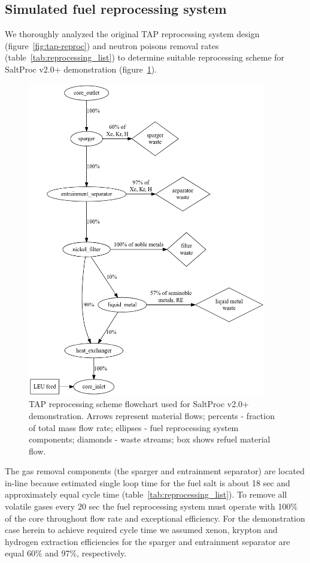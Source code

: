 \documentclass[12pt]{article} %
\begin{document}
\subsection{Simulated fuel reprocessing system}
We thoroughly analyzed the original \gls{TAP} reprocessing system design 
(figure~\ref{fig:tap-reproc}) and neutron poisons removal rates 
(table~\ref{tab:reprocessing_list}) to determine suitable reprocessing 
scheme for SaltProc v2.0+ demonstration (figure~\ref{fig:demo-repro-scheme}).
\begin{figure}[htp!] %
  \centering
		  \includegraphics[width=0.93\textwidth]{demo_reprocessing_scheme.png}
  \caption{\gls{TAP} reprocessing scheme flowchart used for SaltProc v2.0+ 
  demonstration. Arrows represent material flows; percents - fraction of total 
  mass flow rate; ellipses - fuel reprocessing system 
  components; diamonds - waste streams; box shows refuel material flow.}
  \label{fig:demo-repro-scheme}
\end{figure}

The gas removal components (the sparger and entrainment separator) are located 
in-line because estimated single loop time for the fuel salt is about 
18 sec and approximately equal cycle time (table~\ref{tab:reprocessing_list}). 
To remove all volatile gases every 20 sec the fuel reprocessing system must 
operate with 100\% of the core throughout flow rate and exceptional efficiency. 
For the demonstration case herein to achieve required cycle time we assumed 
xenon, krypton and hydrogen extraction efficiencies for the sparger and 
entrainment separator are equal 60\% and 97\%, respectively.
\end{document}
